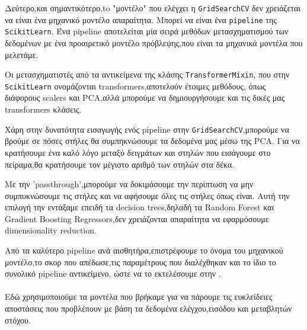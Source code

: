 Δεύτερο,και σημαντικότερο,to "μοντέλο" που ελέγχει η \linebreak \texttt{GridSearchCV} δεν χρειάζεται να είναι ένα μηχανικό μοντέλο απαραίτητα.
Μπορεί να είναι ένα \texttt{pipeline} της \texttt{Scikit\-Learn}.
Ένα pipeline αποτελείται μία σειρά μεθόδων μετασχηματισμού των δεδομένων με ένα προαιρετικό μοντέλο πρόβλεψης,που είναι τα μηχανικά μοντέλα που μελετάμε.

Οι μετασχηματιστές από τα αντικείμενα της κλάσης \texttt{TransformerMixin},
που στην \texttt{Scikit\-Learn} ονομάζονται transformers,αποτελούν έτοιμες μεθόδους,
όπως διάφορους scalers και PCA,αλλά μπορούμε να δημιουργήσουμε και τις δικές μας transformers κλάσεις.

Χάρη στην δυνατότητα εισαγωγής ενός pipeline στην \texttt{GridSearchCV},μπορούμε να βρούμε σε πόσες στήλες θα συμπηκνώσουμε τα δεδομένα μας
μέσω της PCA.
Για να κρατήσουμε ένα καλό λόγο μεταξύ δειγμάτων και στηλών που εισάγουμε στο πείραμα,θα κρατήσουμε τον μέγιστο αριθμό των στηλών στα δέκα.

\begin{center}
\end{center}

Με την 'passthrough',μπορούμε να δοκιμάσουμε την περίπτωση να μην συμπυκνώσουμε τις στήλες και να αφήσουμε όλες τις στήλες όπως είναι.
Αυτή την επιλογή την εντάξαμε επειδή τα decision trees,δηλαδή τα Random Forest και Gradient Boosting Regressors,δεν χρειάζονται απαραίτητα να εφαρμόσουμε dimensionality reduction.

Από τα καλύτερο pipeline ανά αισθητήρα,επιστρέφουμε το όνομα του μηχανικού μοντέλο,το σκορ που απέδωσε,τις παραμέτρους που διαλέχθηκαν και
το ίδιο το συνολικό pipeline αντικείμενο, ώστε να το εκτελέσουμε στην \texttt{}.

\paragraph{\texttt{}}

Εδώ χρησιμοποιούμε τα μοντέλα που βρήκαμε για να πάρουμε τις ευκλείδειες αποστάσεις που προβλέπουν με βάση τα δεδομένα ελέγχου,εισόδου και μεταβλητών στόχου.

\paragraph{\texttt{}}


